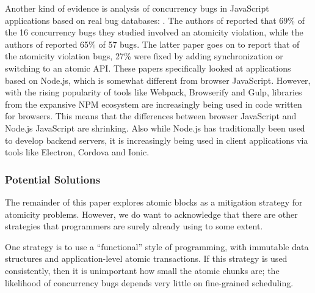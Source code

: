 \documentclass[acmsmall,anonymous,review]{acmart}\settopmatter{printfolios=true,printccs=false,printacmref=false}
\begin{document}

Another kind of evidence is analysis of concurrency bugs in JavaScript applications based on real bug databases: \cite{Davis2017, Hong2014, Wang2017}.
The authors of \cite{Davis2017} reported that 69\% of the 16 concurrency bugs they studied involved an atomicity violation, while the authors of \cite{Wang2017} reported 65\% of 57 bugs.
The latter paper goes on to report that of the atomicity violation bugs, 27\% were fixed by adding synchronization or switching to an atomic API.
These papers specifically looked at applications based on Node.js, which is somewhat different from browser JavaScript.
However, with the rising popularity of tools like Webpack, Browserify and Gulp, libraries from the expansive NPM ecosystem are increasingly being used in code written for browsers.
This means that the differences between browser JavaScript and Node.js JavaScript are shrinking.
Also while Node.js has traditionally been used to develop backend servers, it is increasingly being used in client applications via tools like Electron, Cordova and Ionic.


\subsubsection{Potential Solutions}

The remainder of this paper explores atomic blocks as a mitigation strategy for atomicity problems.
However, we do want to acknowledge that there are other strategies that programmers are surely already using to some extent.

One strategy is to use a ``functional'' style of programming, with immutable data structures and application-level atomic transactions.
If this strategy is used consistently, then it is unimportant how small the atomic chunks are; the likelihood of concurrency bugs depends very little on fine-grained scheduling.
\end{document}
